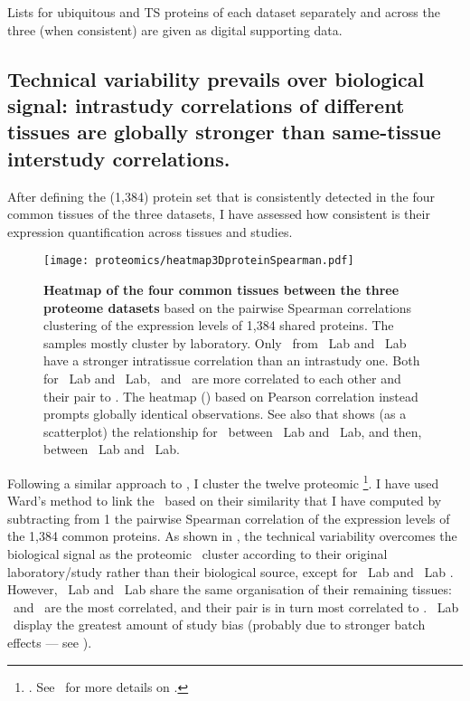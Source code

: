 Lists for ubiquitous and \gls{TS} proteins of each dataset separately
and across the three (when consistent) are given as digital supporting data.\mybr\

\vspace{-3mm}

\subsection{Technical variability prevails over biological signal:
intrastudy correlations of different tissues are globally stronger than
same-tissue interstudy correlations.}\label{subsec:protTechVarHigh}


After defining the (1,384) protein set that is consistently detected
in the four common tissues of the three datasets,
I have assessed how consistent is
their expression quantification across tissues and studies.\mybr\

\begin{figure}[!htbp]
    \texttt{[image: proteomics/heatmap3DproteinSpearman.pdf]}\centering
    \caption[Heatmap of the four common tissues between the three proteome
    datasets]{\label{fig:prot3Dheatmap}\textbf{Heatmap of the four common tissues
    between the three proteome datasets} based on
    the pairwise Spearman correlations clustering of the expression levels
    of 1,384 shared proteins.
    The samples mostly cluster by laboratory.
    Only \heart\ from \cutler\ Lab and \pandey\ Lab have a stronger intratissue correlation
    than an intrastudy one.
    Both for \pandey\ Lab and \cutler\ Lab,
    \pancreas\ and \lung\ are more correlated to each other and their pair to \ovary.
    The heatmap ()
    based on Pearson correlation instead prompts globally identical observations.
    See also  that shows (as a scatterplot)
    the relationship for \Heart\ between \pandey\ Lab and \cutler\ Lab, and then,
     between
    \pandey\ Lab and \kuster\ Lab.
    }
\end{figure}

Following a similar approach to ,
I cluster the twelve proteomic \treps\footnote{.
See~ for more details on \treps{}.}.
I have used Ward's method to link the \treps\ based on their similarity that
I have computed by subtracting from 1 the pairwise Spearman correlation
of the expression levels of the 1,384 common proteins.
As shown in ,
the technical variability overcomes the biological signal
as the proteomic \treps\ cluster according to their original laboratory/study
rather than their biological source,
except for \cutler\ Lab and \pandey\ Lab \heart.
However,
\cutler\ Lab and \pandey\ Lab share the same organisation of their remaining tissues:
\pancreas\ and \lung\ are the most correlated,
and their pair is in turn most correlated to \ovary.
\kuster\ Lab \treps\ display the greatest amount of study bias
(probably due to stronger batch effects --- see ).\mybr\

